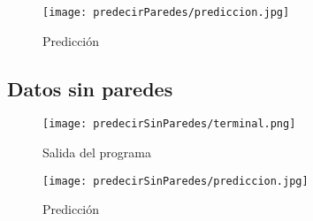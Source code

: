 \begin{figure}[H]
	\centering
	\texttt{[image: predecirParedes/prediccion.jpg]}
	\caption{Predicción}
\end{figure}

\subsection{Datos sin paredes}
\begin{figure}[H]
	\centering
	\texttt{[image: predecirSinParedes/terminal.png]}
	\caption{Salida del programa}
\end{figure}

\begin{figure}[H]
	\centering
	\texttt{[image: predecirSinParedes/prediccion.jpg]}
	\caption{Predicción}
\end{figure}
